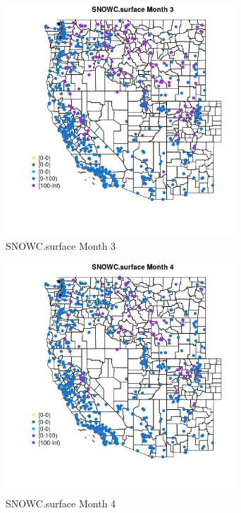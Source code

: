 \begin{figure} 
\centering  
\includegraphics[width=0.77\textwidth]{Code_Outputs/Report_ML_input_PM25_Step4_part_f_de_duplicated_aves_prioritize_24hr_obswNAs_MapObsMo3SNOWCsurface.jpg} 
\caption{\label{fig:Report_ML_input_PM25_Step4_part_f_de_duplicated_aves_prioritize_24hr_obswNAsMapObsMo3SNOWCsurface}SNOWC.surface Month 3} 
\end{figure} 
 

\begin{figure} 
\centering  
\includegraphics[width=0.77\textwidth]{Code_Outputs/Report_ML_input_PM25_Step4_part_f_de_duplicated_aves_prioritize_24hr_obswNAs_MapObsMo4SNOWCsurface.jpg} 
\caption{\label{fig:Report_ML_input_PM25_Step4_part_f_de_duplicated_aves_prioritize_24hr_obswNAsMapObsMo4SNOWCsurface}SNOWC.surface Month 4} 
\end{figure} 
 

